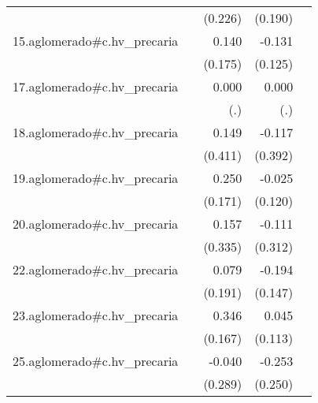 {\begin{longtable}{l*{4}{D{.}{.}{-1}}}
            &                     &     (0.226)         &     (0.190)         &                     \\
\addlinespace
15.aglomerado#c.hv\_precaria&                     &       0.140         &      -0.131         &                     \\
            &                     &     (0.175)         &     (0.125)         &                     \\
\addlinespace
17.aglomerado#c.hv\_precaria&                     &       0.000         &       0.000         &                     \\
            &                     &         (.)         &         (.)         &                     \\
\addlinespace
18.aglomerado#c.hv\_precaria&                     &       0.149         &      -0.117         &                     \\
            &                     &     (0.411)         &     (0.392)         &                     \\
\addlinespace
19.aglomerado#c.hv\_precaria&                     &       0.250         &      -0.025         &                     \\
            &                     &     (0.171)         &     (0.120)         &                     \\
\addlinespace
20.aglomerado#c.hv\_precaria&                     &       0.157         &      -0.111         &                     \\
            &                     &     (0.335)         &     (0.312)         &                     \\
\addlinespace
22.aglomerado#c.hv\_precaria&                     &       0.079         &      -0.194         &                     \\
            &                     &     (0.191)         &     (0.147)         &                     \\
\addlinespace
23.aglomerado#c.hv\_precaria&                     &       0.346\sym{*}  &       0.045         &                     \\
            &                     &     (0.167)         &     (0.113)         &                     \\
\addlinespace
25.aglomerado#c.hv\_precaria&                     &      -0.040         &      -0.253         &                     \\
            &                     &     (0.289)         &     (0.250)         &                     \\

\end{longtable}}
